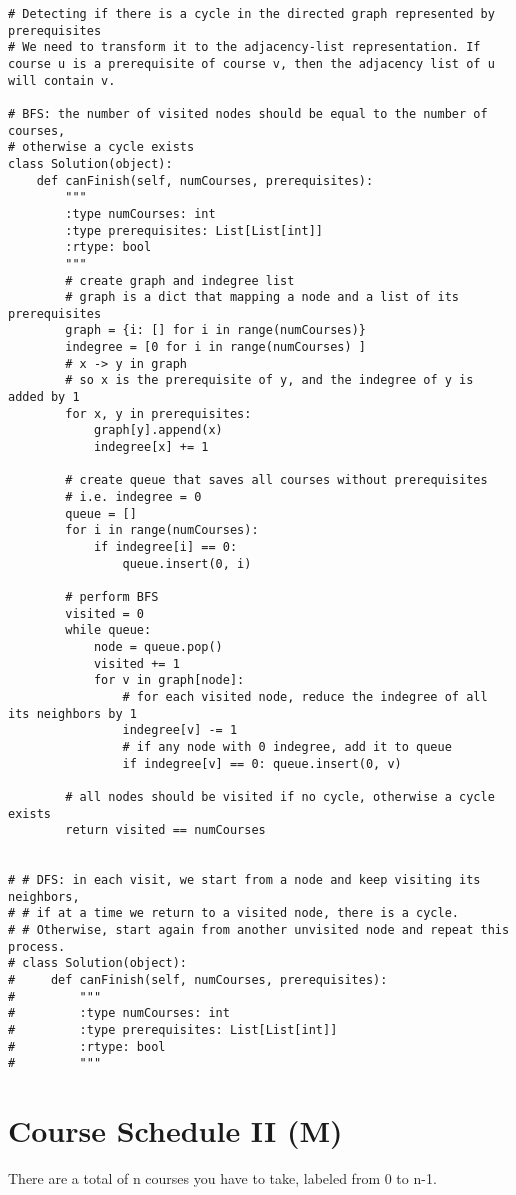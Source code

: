\begin{lstlisting}
# Detecting if there is a cycle in the directed graph represented by prerequisites
# We need to transform it to the adjacency-list representation. If course u is a prerequisite of course v, then the adjacency list of u will contain v.

# BFS: the number of visited nodes should be equal to the number of courses,
# otherwise a cycle exists
class Solution(object):
    def canFinish(self, numCourses, prerequisites):
        """
        :type numCourses: int
        :type prerequisites: List[List[int]]
        :rtype: bool
        """
        # create graph and indegree list
        # graph is a dict that mapping a node and a list of its prerequisites
        graph = {i: [] for i in range(numCourses)}
        indegree = [0 for i in range(numCourses) ]
        # x -> y in graph
        # so x is the prerequisite of y, and the indegree of y is added by 1
        for x, y in prerequisites:
            graph[y].append(x)
            indegree[x] += 1
        
        # create queue that saves all courses without prerequisites
        # i.e. indegree = 0
        queue = []
        for i in range(numCourses):
            if indegree[i] == 0:
                queue.insert(0, i)
        
        # perform BFS
        visited = 0        
        while queue:
            node = queue.pop()
            visited += 1
            for v in graph[node]:
                # for each visited node, reduce the indegree of all its neighbors by 1
                indegree[v] -= 1
                # if any node with 0 indegree, add it to queue
                if indegree[v] == 0: queue.insert(0, v)
                    
        # all nodes should be visited if no cycle, otherwise a cycle exists
        return visited == numCourses
    
    
# # DFS: in each visit, we start from a node and keep visiting its neighbors, 
# # if at a time we return to a visited node, there is a cycle. 
# # Otherwise, start again from another unvisited node and repeat this process.
# class Solution(object):
#     def canFinish(self, numCourses, prerequisites):
#         """
#         :type numCourses: int
#         :type prerequisites: List[List[int]]
#         :rtype: bool
#         """
\end{lstlisting}

\section{Course Schedule II (M)}
There are a total of n courses you have to take, labeled from 0 to n-1.

